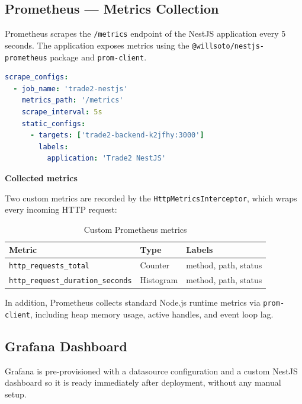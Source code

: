 \documentclass[12pt, a4paper]{article}
\begin{document}
\subsection{Prometheus — Metrics Collection}

Prometheus scrapes the \texttt{/metrics} endpoint of the NestJS application every 5 seconds. The application exposes metrics using the \texttt{@willsoto/nestjs-prometheus} package and \texttt{prom-client}.

\begin{lstlisting}[style=code, language=yaml, caption=prometheus.yml scrape configuration]
scrape_configs:
  - job_name: 'trade2-nestjs'
    metrics_path: '/metrics'
    scrape_interval: 5s
    static_configs:
      - targets: ['trade2-backend-k2jfhy:3000']
        labels:
          application: 'Trade2 NestJS'
\end{lstlisting}

\textbf{Collected metrics}

Two custom metrics are recorded by the \texttt{HttpMetricsInterceptor}, which wraps every incoming HTTP request:

\begin{table}[H]
    \centering
    \begin{tabular}{@{}lll@{}}
        \toprule
        \textbf{Metric} & \textbf{Type} & \textbf{Labels} \\
        \midrule
        \texttt{http\_requests\_total} & Counter & method, path, status \\
        \texttt{http\_request\_duration\_seconds} & Histogram & method, path, status \\
        \bottomrule
    \end{tabular}
    \caption{Custom Prometheus metrics}
\end{table}

In addition, Prometheus collects standard Node.js runtime metrics via \texttt{prom-client}, including heap memory usage, active handles, and event loop lag.

\subsection{Grafana Dashboard}

Grafana is pre-provisioned with a datasource configuration and a custom NestJS dashboard so it is ready immediately after deployment, without any manual setup.
\end{document}
